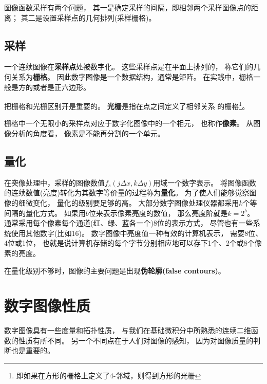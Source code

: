 图像函数采样有两个问题，%
其一是确定采样的间隔，即相邻两个采样图像点的距离；%
其二是设置采样点的几何排列(采样栅格)。

\subsection{采样}
一个连续图像在{\textbf{\color{magenta}采样点}}处被数字化。%
这些采样点是在平面上排列的，%
称它们的几何关系为\textbf{\color{magenta}栅格}。%
因此数字图像是一个数据结构，通常是矩阵。%
在实践中，栅格一般是方的或者是正六边形。

把栅格和光栅区别开是重要的。%
{\textbf{\color{magenta}光栅}}是指在点之间定义了相邻关系
的栅格\footnote{即如果在方形的栅格上定义了4-邻域，则得到方形的光栅}。%

栅格中一个无限小的采样点对应于数字化图像中的一个相元，%
也称作{\textbf{\color{magenta}像素}}。%
从图像分析的角度看，%
像素是不能再分割的一个单元。

\subsection{量化}
在突像处理中，采样的图像数值$f_{s}(j\Delta{}x,k\Delta{}y)$用域一个数字表示。%
将图像函数的连续数值(亮度)转化为其数字等价量的过程称为\textbf{\color{magenta}量化}。%
为了使人们能够觉察图像的细微变化，%
量化的级别要足够的高。%
大部分数字图像处理仪器都采用$k$个等间隔的量化方式。%
如果用$b$位来表示像素亮度的数值，%
那么亮度阶就是$k=2^{b}$。%
通常采用每个像素每个通道(红、绿、蓝各一个)8位的表示方式，%
尽管也有一些系统使用其他数字(比如16)。%
数字图像中亮度值一种有效的计算机表示，%
需要8位、4位或1位，%
也就是说计算机存储的每个字节分别相应地可以存下1个、2个或8个像素的亮度。

在量化级别不够时，图像的主要问题是出现{\textbf{\color{magenta}伪轮廓(false contours)}}。




\section{数字图像性质}
数字图像具有一些度量和拓扑性质，%
与我们在基础微积分中所熟悉的连续二维函数的性质有所不同。%
另一个不同点在于人们对图像的感知，%
因为对图像质量的判断也是重要的。


